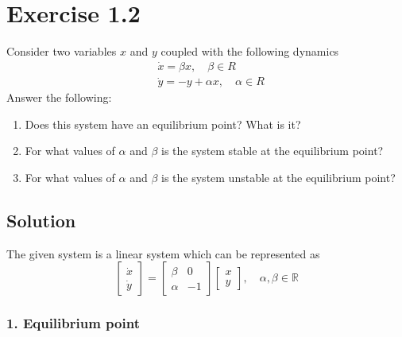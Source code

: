 \section*{Exercise 1.2}

Consider two variables \( x \) and \( y \) coupled with the following dynamics
\begin{align*}
     & \dot{x}=\beta x, \quad \beta \in R      \\
     & \dot{y}=-y+\alpha x, \quad \alpha \in R
\end{align*}
Answer the following:
\begin{enumerate}[noitemsep]
    \item Does this system have an equilibrium point? What is it?
    \item For what values of \( \alpha \) and \( \beta \) is the system stable at the equilibrium point?
    \item For what values of \( \alpha \) and \( \beta \) is the system unstable at the equilibrium point?
\end{enumerate}

\vspace*{-1em}
\subsection*{Solution}

The given system is a linear system which can be represented as
\begin{equation*}
    \begin{bmatrix}
        \dot{x} \\
        \dot{y}
    \end{bmatrix}
    =
    \begin{bmatrix}
        \beta  & 0  \\
        \alpha & -1
    \end{bmatrix}
    \begin{bmatrix}
        x \\
        y
    \end{bmatrix}
    ,\quad \alpha, \beta \in \mathbb{R}
\end{equation*}

\vspace*{-1em}
\subsubsection*{1. Equilibrium point}

